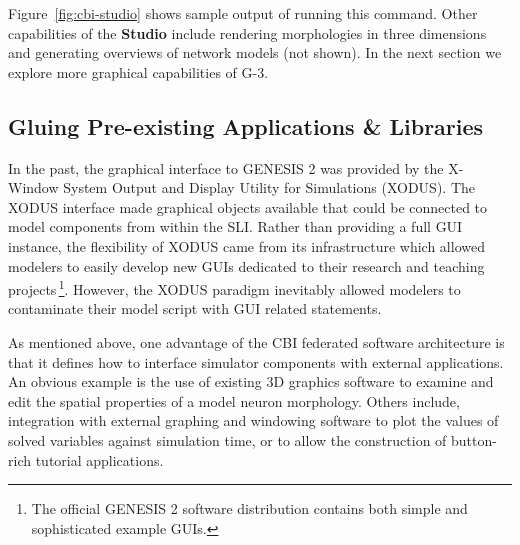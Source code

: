 \documentclass[12pt]{article}
\begin{document}
Figure~\ref{fig:cbi-studio} shows sample output of running this
command.  Other capabilities of the {\bf Studio} include rendering
morphologies in three dimensions and generating overviews of network
models (not shown).  In the next section we explore more graphical
capabilities of G-3.

\subsection{Gluing Pre-existing Applications \& Libraries}

In the past, the graphical interface to GENESIS 2 was provided by the
X-Window System Output and Display Utility for Simulations (XODUS).  The
XODUS interface made graphical objects available that could be
connected to model components from within the SLI.  Rather than
providing a full GUI instance, the flexibility of XODUS came from its
infrastructure which allowed modelers to easily develop new GUIs
dedicated to their research and teaching projects\,\footnote{The
  official GENESIS 2 software distribution contains both simple and
  sophisticated example GUIs.}.  However, the XODUS paradigm
inevitably allowed modelers to contaminate their model script with GUI
related statements.

As mentioned above, one advantage of the CBI federated software
architecture is that it defines how to interface simulator components
with external applications.  An obvious example is the use of existing
3D graphics software to examine and edit the spatial properties of a
model neuron morphology.  Others include, integration with external
graphing and windowing software to plot the values of solved
variables against simulation time, or to allow the construction of
button-rich tutorial applications.
\end{document}
